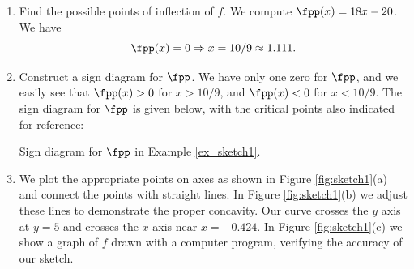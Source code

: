 {\begin{enumerate}
From the sign diagram, we see that $f$ is increasing on $(-\infty,c_1)\cup (c_2,\infty)$ (where $fp(x)>0$, and $f$ is decreasing on $(c_1,c_2)$ (where $fp(x)<0$).

Since $fp$ changes from positive to negative at $c_1$, we know that $(c_1,f(c_1))$ is a local maximum, and since $fp$ changes from negative to positive at $c_2$, we know that $(c_2,f(c_2))$ is a local minimum.

\item		Find the possible points of inflection of $f$. We compute $\fpp(x) = 18x-20$. We have 
\[
\fpp(x) = 0 \Rightarrow x= 10/9 \approx 1.111.
\]
\item		Construct a sign diagram for $\fpp$.
We have only one zero for $\fpp$, and we easily see that $\fpp(x)>0$ for $x>10/9$, and $\fpp(x)<0$ for $x<10/9$. The sign diagram for $\fpp$ is given below, with the critical points also indicated for reference:

\noindent\begin{minipage}{\textwidth}
\begin{center}
\end{center}
\captionsetup{type=figure}%
			\caption{Sign diagram for $\fpp$ in Example \ref{ex_sketch1}.}\label{fig:sketchline1fpp}
\end{minipage}


\item		We plot the appropriate points on axes as shown in Figure \ref{fig:sketch1}(a) and connect the points with straight lines. In Figure \ref{fig:sketch1}(b) we adjust these lines to demonstrate the proper concavity. Our curve crosses the $y$ axis at $y=5$ and crosses the $x$ axis near $x=-0.424$. In Figure \ref{fig:sketch1}(c) we show a graph of $f$ drawn with a computer program, verifying the accuracy of our sketch.
\end{enumerate}

}

